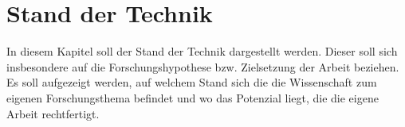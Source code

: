 \chapter{Stand der Technik}
\label{chap:SdT}

In diesem Kapitel soll der Stand der Technik dargestellt werden. Dieser soll sich insbesondere auf die Forschungshypothese bzw. Zielsetzung der Arbeit beziehen. Es soll aufgezeigt werden, auf welchem Stand sich die die Wissenschaft zum eigenen Forschungsthema befindet und wo das Potenzial liegt, die die eigene Arbeit rechtfertigt.